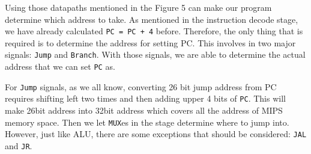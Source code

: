 \documentclass{homework}
\begin{document}
Using those datapaths mentioned in the Figure 5 can make our program determine which address to take. As mentioned in the instruction decode stage, we have already calculated \texttt{PC = PC + 4} before. Therefore, the only thing that is required is to determine the address for setting PC. This involves in two major signals: \texttt{Jump} and \texttt{Branch}. With those signals, we are able to determine the actual address that we can set \texttt{PC} as. 

For \texttt{Jump} signals, as we all know, converting 26 bit jump address from PC requires shifting left two times and then adding upper 4 bits of \texttt{PC}. This will make 26bit address into 32bit address which covers all the address of MIPS memory space. Then we let \texttt{MUX}es in the stage determine where to jump into. However, just like ALU, there are some exceptions that should be considered: \texttt{JAL} and \texttt{JR}.
\end{document}
